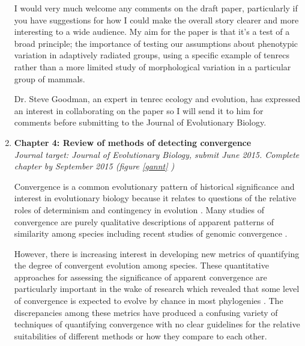 \documentclass[12pt,a4paper]{article}
\begin{document}
\begin{enumerate}

I would very much welcome any comments on the draft paper, particularly if you have suggestions for how I could make the overall story clearer and more interesting to a wide audience. My aim for the paper is that it's a test of a broad principle; the importance of testing our assumptions about phenotypic variation in adaptively radiated groups, using a specific example of tenrecs rather than a more limited study of morphological variation in a particular group of mammals.

Dr. Steve Goodman, an expert in tenrec ecology and evolution, has expressed an interest in collaborating on the paper so I will send it to him for comments before submitting to the Journal of Evolutionary Biology.

\item \textbf{Chapter 4: Review of methods of detecting convergence}\\
\textit{Journal target: Journal of Evolutionary Biology, submit June 2015. Complete chapter by September 2015 (figure  \ref{gannt} )}

Convergence is a common evolutionary pattern of historical significance and interest in evolutionary biology because it relates to questions of the relative roles of determinism and contingency in evolution \citep[c.f][]{Blount2008}. Many studies of convergence are purely qualitative descriptions of apparent patterns of similarity among species \citep[e.g.][]{Ben-Moshe2001, Leal2002, Fleischer2008} including recent studies of genomic convergence \citep{Jones2012, Parker2013}. 

However, there is increasing interest in developing new metrics of quantifying the degree of convergent evolution among species. These quantitative approaches for assessing the significance of apparent convergence are particularly important in the wake of research which revealed that some level of convergence is expected to evolve by chance in most phylogenies \citep{Stayton2008}.
The discrepancies among these metrics have produced a confusing variety of techniques of quantifying convergence with no clear guidelines for the relative suitabilities of different methods or how they compare to each other.
   


\end{enumerate}
\end{document}
